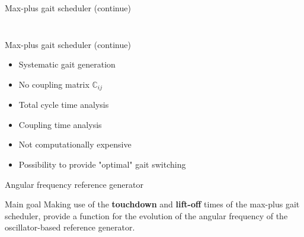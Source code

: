 \documentclass{beamer}
\begin{document}
\begin{frame}{Max-plus gait scheduler (continue)}
\begin{columns}
\begin{column}{0.55\textwidth}
\begin{table}[]
\centering
\label{my-label}
\end{table}

\end{column}
\end{columns}
\end{frame}

\begin{frame}{Max-plus gait scheduler (continue)}
\begin{itemize}
	\setlength\itemsep{2em}
	\item Systematic gait generation 
	\item No coupling matrix $\mathbb{C}_{ij}$
	\item Total cycle time analysis
	\item Coupling time analysis
	\item Not computationally expensive
	\item Possibility to provide "optimal" gait switching
\end{itemize}	
\end{frame}

\begin{frame}{Angular frequency reference generator}
	\begin{block}{Main goal}
		\Large Making use of the \textbf{touchdown} and \textbf{lift-off} times of the max-plus gait scheduler, provide a function for the evolution of the angular frequency of the oscillator-based reference generator.
	\end{block}
\end{frame}
\end{document}
